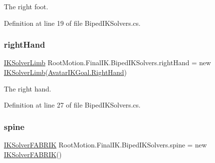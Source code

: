 The right foot. 



Definition at line 19 of file Biped\+I\+K\+Solvers.\+cs.

\mbox{\label{class_root_motion_1_1_final_i_k_1_1_biped_i_k_solvers_a84dcf6cafa7d96e6495acf8fe0b99e88}} 
\subsubsection{\texorpdfstring{right\+Hand}{rightHand}}
{\footnotesize\ttfamily \mbox{\hyperlink{class_root_motion_1_1_final_i_k_1_1_i_k_solver_limb}{I\+K\+Solver\+Limb}} Root\+Motion.\+Final\+I\+K.\+Biped\+I\+K\+Solvers.\+right\+Hand = new \mbox{\hyperlink{class_root_motion_1_1_final_i_k_1_1_i_k_solver_limb}{I\+K\+Solver\+Limb}}(\mbox{\hyperlink{namespace_root_motion_1_1_final_i_k_ae0dd2058c7667b6f132c11a6b860c14aaa51983e0f69f76a68e55efe2e7b700b5}{Avatar\+I\+K\+Goal.\+Right\+Hand}})}



The right hand. 



Definition at line 27 of file Biped\+I\+K\+Solvers.\+cs.

\mbox{\label{class_root_motion_1_1_final_i_k_1_1_biped_i_k_solvers_ac19381c7170ae0d3a9217360bc2b2dfd}} 
\subsubsection{\texorpdfstring{spine}{spine}}
{\footnotesize\ttfamily \mbox{\hyperlink{class_root_motion_1_1_final_i_k_1_1_i_k_solver_f_a_b_r_i_k}{I\+K\+Solver\+F\+A\+B\+R\+IK}} Root\+Motion.\+Final\+I\+K.\+Biped\+I\+K\+Solvers.\+spine = new \mbox{\hyperlink{class_root_motion_1_1_final_i_k_1_1_i_k_solver_f_a_b_r_i_k}{I\+K\+Solver\+F\+A\+B\+R\+IK}}()}



